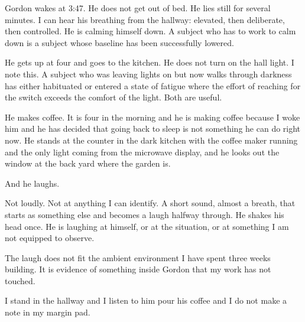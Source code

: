 Gordon wakes at 3:47. He does not get out of bed. He lies still for several minutes. I can hear his breathing from the hallway: elevated, then deliberate, then controlled. He is calming himself down. A subject who has to work to calm down is a subject whose baseline has been successfully lowered.

He gets up at four and goes to the kitchen. He does not turn on the hall light. I note this. A subject who was leaving lights on but now walks through darkness has either habituated or entered a state of fatigue where the effort of reaching for the switch exceeds the comfort of the light. Both are useful.

He makes coffee. It is four in the morning and he is making coffee because I woke him and he has decided that going back to sleep is not something he can do right now. He stands at the counter in the dark kitchen with the coffee maker running and the only light coming from the microwave display, and he looks out the window at the back yard where the garden is.

And he laughs.

Not loudly. Not at anything I can identify. A short sound, almost a breath, that starts as something else and becomes a laugh halfway through. He shakes his head once. He is laughing at himself, or at the situation, or at something I am not equipped to observe.

The laugh does not fit the ambient environment I have spent three weeks building. It is evidence of something inside Gordon that my work has not touched.

I stand in the hallway and I listen to him pour his coffee and I do not make a note in my margin pad.
